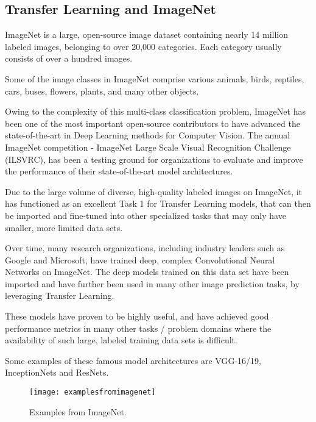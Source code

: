 	\subsection{Transfer Learning and ImageNet}
	\begin{bulletedlist}
		\item ImageNet is a large, open-source image dataset containing nearly 14 million labeled images, belonging to over 20,000 categories. Each category usually consists of over a hundred images.
		\item Some of the image classes in ImageNet comprise various animals, birds, reptiles, cars, buses, flowers, plants, and many other objects.
		\item Owing to the complexity of this multi-class classification problem, ImageNet has been one of the most important open-source contributors to have advanced the state-of-the-art in Deep Learning methods for Computer Vision. The annual ImageNet competition - ImageNet Large Scale Visual Recognition Challenge (ILSVRC), has been a testing ground for organizations to evaluate and
improve the performance of their state-of-the-art model architectures.
		\item Due to the large volume of diverse, high-quality labeled images on ImageNet, it has functioned as an excellent Task 1 for Transfer Learning models, that can then be imported and fine-tuned into other specialized tasks that may only have smaller, more limited data sets.
		\item Over time, many research organizations, including industry leaders such as Google and Microsoft, have trained deep, complex Convolutional Neural Networks on ImageNet.  The deep models trained on this data set have been imported and have further been used in many other image prediction tasks, by leveraging Transfer Learning.
		\item These models have proven to be highly useful, and have achieved good performance metrics in many other tasks / problem domains where the availability of such large, labeled training data sets is difficult.
		\item Some examples of these famous model architectures are VGG-16/19, InceptionNets and ResNets.
	\end{bulletedlist}

	\begin{figure}[tbh]
		\centering
		\texttt{[image: examplesfromimagenet]}
		\caption[Examples from ImageNet]{Examples from ImageNet.}
		\label{fig:examplesfromimagenet}
	\end{figure}

